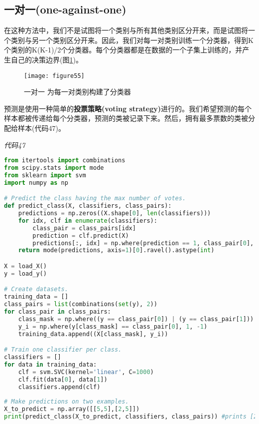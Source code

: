 \subsection{一对一(one-against-one)}

在这种方法中，我们不是试图将一个类别与所有其他类别区分开来，而是试图将一个类别与另一个类别区分开来。因此，我们对每一对类别训练一个分类器，得到K个类别的K(K-1)/2个分类器。每个分类器都是在数据的一个子集上训练的，并产生自己的决策边界(图\ref{figure55})。

\begin{figure}[ht]
	\centering
	\texttt{[image: figure55]}
	\caption{一对一 为每一对类别构建了分类器}
	\label{figure55}
\end{figure}

预测是使用一种简单的\textbf{投票策略(voting strategy)}进行的。我们希望预测的每个样本都被传递给每个分类器，预测的类被记录下来。然后，拥有最多票数的类被分配给样本(代码47)。

\emph{代码47}

\begin{lstlisting}[language=python]
from itertools import combinations 
from scipy.stats import mode 
from sklearn import svm 
import numpy as np 

# Predict the class having the max number of votes. 
def predict_class(X, classifiers, class_pairs): 
    predictions = np.zeros((X.shape[0], len(classifiers))) 
    for idx, clf in enumerate(classifiers): 
        class_pair = class_pairs[idx] 
        prediction = clf.predict(X) 
        predictions[:, idx] = np.where(prediction == 1, class_pair[0], class_pair[1]) 
    return mode(predictions, axis=1)[0].ravel().astype(int) 

X = load_X() 
y = load_y() 

# Create datasets. 
training_data = [] 
class_pairs = list(combinations(set(y), 2)) 
for class_pair in class_pairs: 
    class_mask = np.where((y == class_pair[0]) | (y == class_pair[1])) 
    y_i = np.where(y[class_mask] == class_pair[0], 1, -1) 
    training_data.append((X[class_mask], y_i)) 

# Train one classifier per class. 
classifiers = [] 
for data in training_data: 
    clf = svm.SVC(kernel='linear', C=1000) 
    clf.fit(data[0], data[1]) 
    classifiers.append(clf) 
    
# Make predictions on two examples. 
X_to_predict = np.array([[5,5],[2,5]]) 
print(predict_class(X_to_predict, classifiers, class_pairs)) #prints [2 1]
\end{lstlisting}



